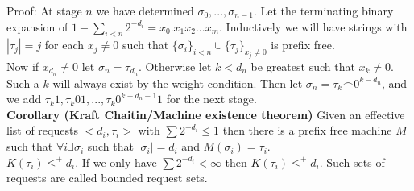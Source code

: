\documentclass{article}
\begin{document}
	Proof: At stage $n$ we have determined $\sigma_0,...,\sigma_{n-1}$. Let the terminating binary expansion of $1-\sum_{i<n} 2^{-d_i} = x_0.x_1x_2...x_m$. Inductively we will have strings with $|\tau_j| = j$ for each $x_j \neq 0$ such that $\{\sigma_i\}_{i<n}\cup \{\tau_j\}_{x_j \neq 0}$ is prefix free. \\
	Now if $x_{d_n} \neq 0$ let $\sigma_n = \tau_{d_n}$. Otherwise let $k < d_n$ be greatest such that $x_k \neq 0$. Such a $k$ will always exist by the weight condition. Then let $\sigma_n = \tau_k \frown 0^{k-d_n}$, and we add $\tau_k1, \tau_k01,...,\tau_k0^{k-d_n-1}1$ for the next stage.\\
	\textbf{Corollary (Kraft Chaitin/Machine existence theorem)} Given an effective list of requests $<d_i,\tau_i>$ with $\sum 2^{-d_i} \leq 1$ then there is a prefix free machine $M$ such that $\forall i \exists \sigma_i $ such that $|\sigma_i| = d_i$ and $M(\sigma_i)=\tau_i$.\\
	$K(\tau_i) \leq^+ d_i$. If we only have $\sum 2^{-d_i} < \infty$ then $K(\tau_i) \leq^+ d_i$. Such sets of requests are called bounded request sets.
	\newpage
\end{document}
